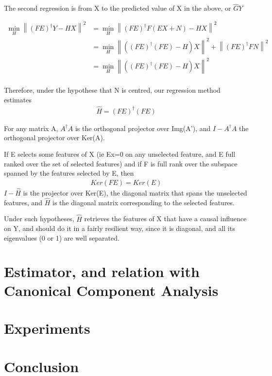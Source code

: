 \documentclass{article}
\begin{document}
The second regression is from X to the predicted value of X in the above, or $\hat G  Y$

\begin{equation}
\begin{aligned}
\min_H \left \| (FE)^{\dagger}Y - HX \right \|^2 &= \min_H \left \| (FE)^{\dagger}F(EX+N) - HX \right \|^2 \\
&= \min_H \left \| ((FE)^{\dagger}(FE)-H)X \right \| ^2 + \left \| (FE)^{\dagger}FN \right \| ^2\\
&= \min_H \left \| ((FE)^{\dagger}(FE)-H)X \right \| ^2\\
\end{aligned}
\end{equation}

Therefore, under the hypothese that N is centred, our regression method estimates 
\begin{equation}
\begin{aligned}
\hat H =(FE)^{\dagger}(FE)
\end{aligned}
\end{equation}

For any matrix A, $A^\dagger A$ is the orthogonal projector over Img(A'), and $I-A^\dagger A$ the orthogonal projector over Ker(A). 

If E selects some features of X (ie Ex=0 on any unselected feature, and E full ranked over the set of selected features) and if F is full rank over the subspace spanned by the features selected by E, then 
\begin{equation}
\begin{aligned}
Ker(FE) = Ker(E)  
\end{aligned}
\end{equation}
$I - \hat H$ is the projector over Ker(E), the diagonal matrix that spans the unselected features, and $\hat H$ is the diagonal matrix corresponding to the selected features.

Under such hypotheses, $\hat H$ retrieves the features of X that have a causal influence on Y, and should do it in a fairly resilient way, since it is diagonal, and all its eigenvalues (0 or 1) are well separated.

\section{Estimator, and relation with Canonical Component Analysis}
 

\section{Experiments}

\section{Conclusion}

\clearpage
\newpage



\end{document}
